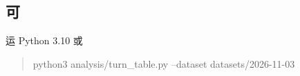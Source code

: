\documentclass[11pt,a4paper]{article}
\numberwithin{equation}{section}
\numberwithin{figure}{section}
\begin{document}
\subsection{{\cjkfont 可}\allowbreak{}}

{\cjkfont 运}\allowbreak{} Python 3.10 {\cjkfont 或}\allowbreak{}

\begin{quote}\ttfamily\footnotesize python3 analysis/\allowbreak{}turn\_table.py --dataset datasets/\allowbreak{}2026-11-03\end{quote}
\end{document}
